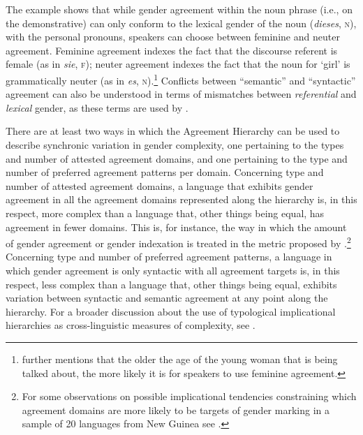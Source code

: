 \documentclass[output=collectionpaper]{langsci/langscibook}
\begin{document}
The example shows that while gender agreement within the noun phrase (i.e., on the demonstrative) can only conform to the lexical gender of the noun (\textit{dieses}, \textsc{n}), with the personal pronouns, speakers can choose between feminine and neuter agreement. Feminine agreement indexes the fact that the discourse referent is female (as in \textit{sie}, \textsc{f}); neuter agreement indexes the fact that the noun for `girl' is grammatically neuter (as in \textit{es}, \textsc{n}).\footnote{\citet[228]{Corbett1991} further mentions that the older the age of the young woman that is being talked about, the more likely it is for speakers to use feminine agreement.}  Conflicts between ``semantic'' and ``syntactic'' agreement can also be understood in terms of mismatches between \textit{referential} and \textit{lexical} gender, as these terms are used by \citet{Dahl2000a} \citep[see also the study of the evolution of gender marking in medieval  by][]{Siemund2011}.

There are at least two ways in which the Agreement Hierarchy can be used to describe synchronic variation in gender complexity, one pertaining to the types and number of attested agreement domains, and one pertaining to the type and number of preferred agreement patterns per domain. Concerning type and number of attested agreement domains, a language that exhibits gender agreement in all the agreement domains represented along the hierarchy is, in this respect, more complex than a language that, other things being equal, has agreement in fewer domains. This is, for instance, the way in which the amount of gender agreement or gender indexation is treated in the metric proposed by \citet{DiGarbo2016}.\footnote{For some observations on possible  implicational tendencies constraining which agreement domains are more likely to be targets of gender marking in a sample of 20 languages from New Guinea see \citet{Svaerdthisyear}.} Concerning type and number of preferred agreement patterns, a language in which gender agreement is only syntactic with all agreement targets is, in this respect, less complex than a language that, other things being equal, exhibits variation between syntactic and semantic agreement at any point along the hierarchy. For a broader discussion about the use of typological implicational hierarchies as cross-linguistic measures of complexity, see \citet{Miestamo2009}.
\end{document}
